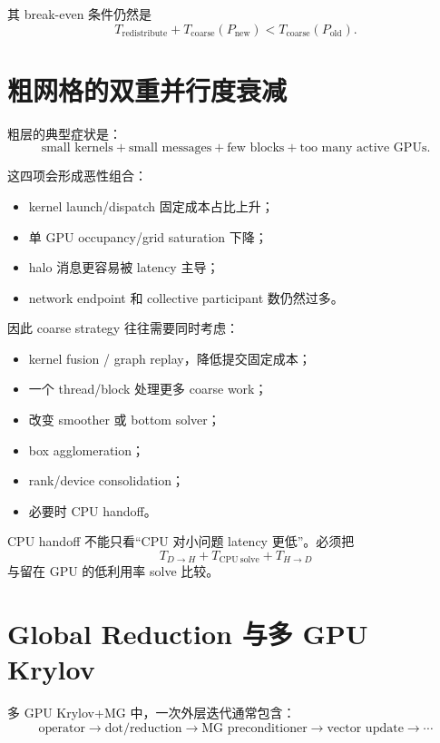 其 break-even 条件仍然是
\begin{equation}
T_{\mathrm{redistribute}}
+
T_{\mathrm{coarse}}(P_{\mathrm{new}})
<
T_{\mathrm{coarse}}(P_{\mathrm{old}}).
\label{eq:distributed-gpu-consolidation-break-even}
\end{equation}

\section{粗网格的双重并行度衰减}

粗层的典型症状是：
\begin{equation}
\boxed{
\text{small kernels}
+
\text{small messages}
+
\text{few blocks}
+
\text{too many active GPUs}.
}
\end{equation}

这四项会形成恶性组合：
\begin{itemize}
\item kernel launch/dispatch 固定成本占比上升；
\item 单 GPU occupancy/grid saturation 下降；
\item halo 消息更容易被 latency 主导；
\item network endpoint 和 collective participant 数仍然过多。
\end{itemize}

因此 coarse strategy 往往需要同时考虑：
\begin{itemize}
\item kernel fusion / graph replay，降低提交固定成本；
\item 一个 thread/block 处理更多 coarse work；
\item 改变 smoother 或 bottom solver；
\item box agglomeration；
\item rank/device consolidation；
\item 必要时 CPU handoff。
\end{itemize}

CPU handoff 不能只看“CPU 对小问题 latency 更低”。必须把
\begin{equation}
T_{D\rightarrow H}
+
T_{\mathrm{CPU\ solve}}
+
T_{H\rightarrow D}
\end{equation}
与留在 GPU 的低利用率 solve 比较。

\section{Global Reduction 与多 GPU Krylov}

多 GPU Krylov+MG 中，一次外层迭代通常包含：
\begin{equation}
\text{operator}
\rightarrow
\text{dot/reduction}
\rightarrow
\text{MG preconditioner}
\rightarrow
\text{vector update}
\rightarrow\cdots
\end{equation}


